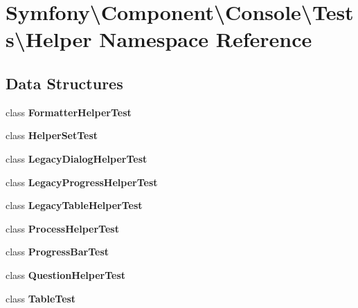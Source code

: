 \section{Symfony\textbackslash{}Component\textbackslash{}Console\textbackslash{}Tests\textbackslash{}Helper Namespace Reference}
\label{namespace_symfony_1_1_component_1_1_console_1_1_tests_1_1_helper}
\subsection*{Data Structures}
\begin{DoxyCompactItemize}
\item 
class {\bf Formatter\+Helper\+Test}
\item 
class {\bf Helper\+Set\+Test}
\item 
class {\bf Legacy\+Dialog\+Helper\+Test}
\item 
class {\bf Legacy\+Progress\+Helper\+Test}
\item 
class {\bf Legacy\+Table\+Helper\+Test}
\item 
class {\bf Process\+Helper\+Test}
\item 
class {\bf Progress\+Bar\+Test}
\item 
class {\bf Question\+Helper\+Test}
\item 
class {\bf Table\+Test}
\end{DoxyCompactItemize}
